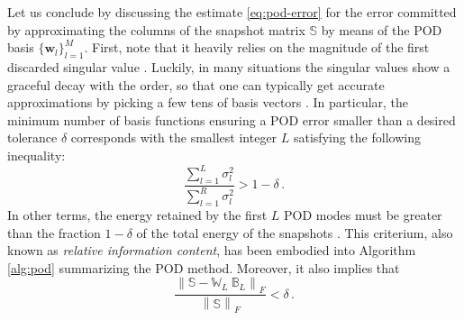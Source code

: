 \documentclass{elsarticle}
\theoremstyle{theorem}
\theoremstyle{definition}
\theoremstyle{remark}
\theoremstyle{proposition}
\numberwithin{figure}{section}
\newcommand{\norm}[1]{\left\lVert#1\right\rVert}
\begin{document}
	\iffalse
		Let us conclude by discussing the estimate \eqref{eq:pod-error} for the error committed by approximating the columns of the snapshot matrix $\mathbb{S}$ by means of the POD basis $\big\lbrace \mathbf{w}_l \big\rbrace_{l = 1}^M$. First, note that it heavily relies on the magnitude of the first discarded singular value \cite{HSR16}. Luckily, in many situations the singular values show a graceful decay with the order, so that one can typically get accurate approximations by picking a few tens of basis vectors \cite{Bur06}. In particular, the minimum number of basis functions ensuring a POD error smaller than a desired tolerance $\delta$ corresponds with the smallest integer $L$ satisfying the following inequality:
		\begin{equation}
			\label{eq:relative-information-content}
			\dfrac{\sum_{l = 1}^{L} \sigma_l^2}{\sum_{l = 1}^R \sigma_l^2} > 1 - \delta \, .
		\end{equation}
		In other terms, the energy retained by the first $L$ POD modes must be greater than the fraction $1 - \delta$ of the total energy of the snapshots \cite{QMN15}. This criterium, also known as \emph{relative information content}, has been embodied into Algorithm \ref{alg:pod} summarizing the POD method. Moreover, it also implies that
		\begin{equation*}
			\dfrac{\norm{\mathbb{S} - \mathbb{W}_{L} ~ \mathbb{B}_{L}}_F}{\norm{\mathbb{S}}_F} < \delta \, .
		\end{equation*}
\end{document}
